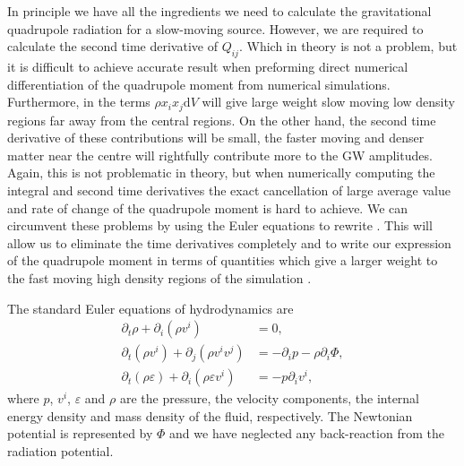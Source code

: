 In principle we have all the ingredients we need to calculate the gravitational quadrupole radiation for a slow-moving source.
However, we are required to calculate the second time derivative of $Q_{ij}$. Which in theory is not a problem, but
it is difficult to achieve accurate result when preforming direct numerical differentiation of the
quadrupole moment from numerical simulations. Furthermore, in  the terms $\rho x_i x_j \mathrm{d} V$ will give large weight
slow moving low density regions far away from the central regions. On the other hand, the second time derivative of these contributions
will be small, the faster moving and denser matter near the centre will rightfully contribute more to the GW amplitudes.  
Again, this is not problematic in theory, but when numerically computing the integral and second time derivatives 
the exact cancellation of large average value and rate of change of the quadrupole moment is hard to achieve.
We can circumvent these problems by using the Euler equations to rewrite . This will allow us to
eliminate the time derivatives completely and to write our expression of the quadrupole moment in terms of quantities 
which give a larger weight to the fast moving high density regions of the simulation \citep{oohara_97,finn_89,blanchet_90}.

The standard Euler equations of hydrodynamics are
\begin{subequations} 
\begin{align}
\partial_t \rho + \partial_i (\rho v^i) &= 0, \label{eqT:cont} \\  
\partial_t (\rho v^i) + \partial_j (\rho v^i v^j) & = -\partial_i p - \rho \partial_i \Phi, \label{eqT:mom} \\ 
\partial_t (\rho \varepsilon) + \partial_i (\rho \varepsilon v^i) & = -p \partial_i v^i, \label{eqT:enrg} 
\end{align}
\end{subequations}
where $p$, $v^i$, $\varepsilon$ and $\rho$ are the pressure, the velocity components, the internal energy density
and mass density of the fluid, respectively. The Newtonian potential is represented by $\Phi$ and we have 
neglected any back-reaction from the radiation potential.  

